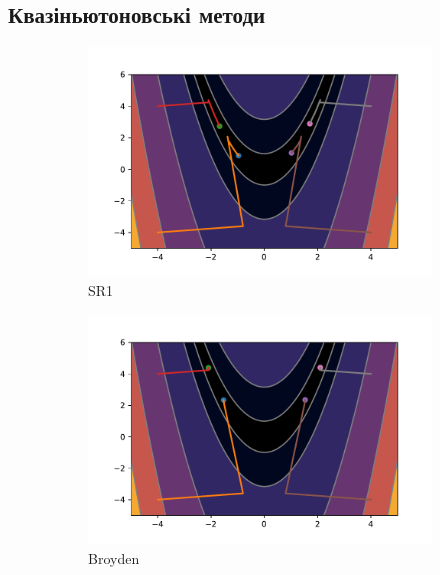\pagebreak
\subsection*{Квазіньютоновські методи}

\begin{figure}[h!]
    \begin{subfigure}{0.5\textwidth}
        \includegraphics[width=\textwidth, trim=1.4cm 0.5cm 1.3cm 1cm, clip]{assets/SR1/rosenbrock.pdf}
        \caption{SR1}
    \end{subfigure}
    \begin{subfigure}{0.5\textwidth}
        \includegraphics[width=\textwidth, trim=1.4cm 0.5cm 1.3cm 1cm, clip]{assets/Broyden/rosenbrock.pdf}
        \caption{Broyden}
    \end{subfigure}
    \begin{subfigure}{0.5\textwidth}

\end{subfigure}
\end{figure}
